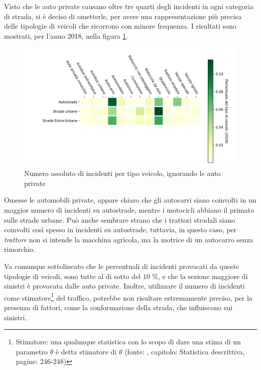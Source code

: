 \documentclass[a4paper]{report}
\newcommand{\quotestyle}[1]{\textit{#1}}
\begin{document}
Visto che le auto private causano oltre tre quarti degli 
incidenti in ogni categoria di strada,  
si è deciso di ometterle, per avere una rappresentazione più 
precisa delle tipologie di veicoli che ricorrono con minore frequenza. 
I risultati sono mostrati, per l'anno 2018, 
nella figura \ref{fig:differenza-strade-no-auto}. 

\begin{figure}
    \includegraphics[width=\linewidth]{../src/incidenti/incidenti_senza_coords/tipo_veicoli/differenza_senza_auto.png}
    \caption{Numero assoluto di incidenti per tipo veicolo, ignorando le auto private}
    \label{fig:differenza-strade-no-auto}
\end{figure}

Omesse le automobili private, appare chiaro che gli autocarri siano coinvolti in un maggior 
numero di incidenti su autostrade, mentre i motocicli abbiano il primato sulle strade urbane. 
Può anche sembrare strano che i trattori stradali siano coinvolti così spesso in incidenti 
su autostrade, tuttavia, in questo caso, per \quotestyle{trattore} non si intende la macchina 
agricola, ma la motrice di un autocarro senza rimorchio. 

Va comunque sottolineato che le percentuali di incidenti provocati da queste tipologie di 
veicoli, sono tutte al di sotto del $10$ \%, e che la sezione maggiore di sinistri è 
provocata dalle auto private. 
Inoltre, utilizzare il numero di incidenti come 
stimatore\footnote{Stimatore: una qualunque statistica con 
lo scopo di dare una stima di un parametro $\theta$ è detta stimatore 
di $\theta$ (fonte: \cite{PROB_E_STATISTICA:1}, 
capitolo: Statistica descrittiva, pagine: 246-248)} del traffico, potrebbe non risultare 
estremamente preciso, per la presenza di fattori, come la conformazione della strada, che 
influiscono sui sinistri. 
\end{document}
